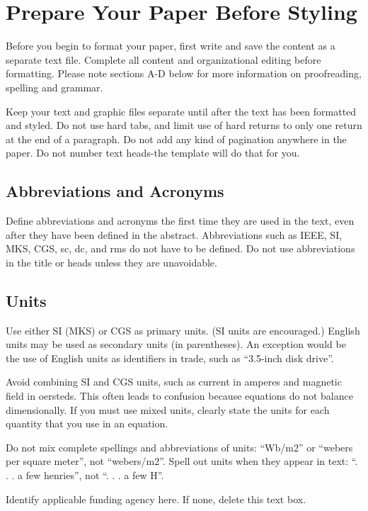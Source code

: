 \documentclass[preprint,12pt,authoryear]{elsarticle}
\begin{document}
\section{Prepare Your Paper Before Styling}

Before you begin to format your paper, first write and save the content as a separate text file. Complete all content and organizational editing before formatting. Please note sections A-D below for more information on proofreading, spelling and grammar.

Keep your text and graphic files separate until after the text has been formatted and styled. Do not use hard tabs, and limit use of hard returns to only one return at the end of a paragraph. Do not add any kind of pagination anywhere in the paper. Do not number text heads-the template will do that for you.

\subsection{Abbreviations and Acronyms}

Define abbreviations and acronyms the first time they are used in the text, even after they have been defined in the abstract. Abbreviations such as IEEE, SI, MKS, CGS, sc, dc, and rms do not have to be defined. Do not use abbreviations in the title or heads unless they are unavoidable.

\subsection{Units}

Use either SI (MKS) or CGS as primary units. (SI units are encouraged.) English units may be used as secondary units (in parentheses). An exception would be the use of English units as identifiers in trade, such as “3.5-inch disk drive”.

Avoid combining SI and CGS units, such as current in amperes and magnetic field in oersteds. This often leads to confusion because equations do not balance dimensionally. If you must use mixed units, clearly state the units for each quantity that you use in an equation.

Do not mix complete spellings and abbreviations of units: “Wb/m2” or “webers per square meter”, not “webers/m2”.  Spell out units when they appear in text: “. . . a few henries”, not “. . . a few H”.

Identify applicable funding agency here. If none, delete this text box.
\end{document}
